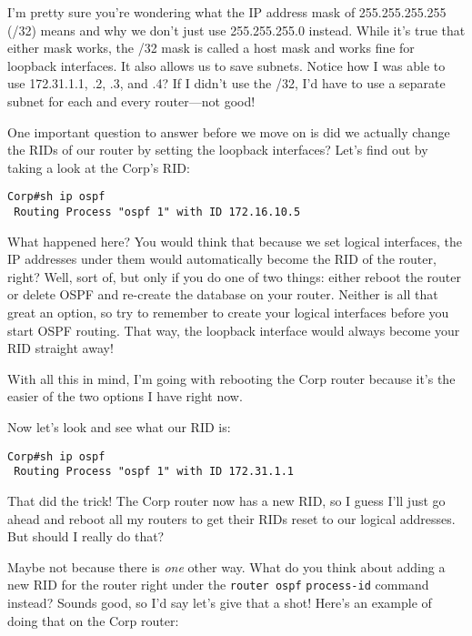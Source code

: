 I'm pretty sure you're wondering what the IP address mask of
255.255.255.255 (/32) means and why we don't just use 255.255.255.0
instead. While it's true that either mask works, the /32 mask is called
a host mask and works fine for loopback interfaces. It also allows us to
save subnets. Notice how I was able to use 172.31.1.1, .2, .3, and .4?
If I didn't use the /32, I'd have to use a separate subnet for each and
every router---not good!

\protect\hypertarget{c18.xhtmlux5cux23Page_764}{}{}One important
question to answer before we move on is did we actually change the RIDs
of our router by setting the loopback interfaces? Let's find out by
taking a look at the Corp's RID:

\begin{verbatim}
Corp#sh ip ospf
 Routing Process "ospf 1" with ID 172.16.10.5
\end{verbatim}

What happened here? You would think that because we set logical
interfaces, the IP addresses under them would automatically become the
RID of the router, right? Well, sort of, but only if you do one of two
things: either reboot the router or delete OSPF and re-create the
database on your router. Neither is all that great an option, so try to
remember to create your logical interfaces before you start OSPF
routing. That way, the loopback interface would always become your RID
straight away!

With all this in mind, I'm going with rebooting the Corp router because
it's the easier of the two options I have right now.

Now let's look and see what our RID is:

\begin{verbatim}
Corp#sh ip ospf
 Routing Process "ospf 1" with ID 172.31.1.1
\end{verbatim}

That did the trick! The Corp router now has a new RID, so I guess I'll
just go ahead and reboot all my routers to get their RIDs reset to our
logical addresses. But should I really do that?

Maybe not because there is \emph{one} other way. What do you think about
adding a new RID for the router right under the \texttt{router\ ospf}
\texttt{process-id} command instead? Sounds good, so I'd say let's give
that a shot! Here's an example of doing that on the Corp router:


